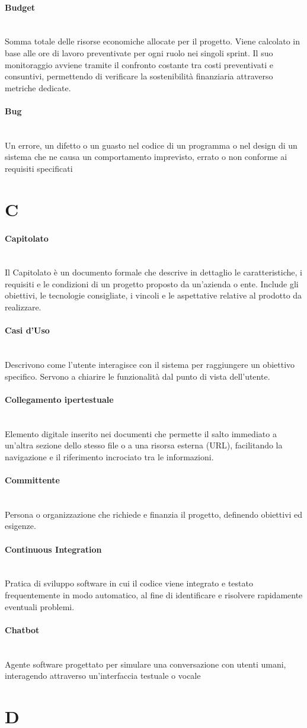 \documentclass[a4paper, 10pt, colorlinks=true, linkcolor=black, urlcolor=blue, citecolor=blue, hidelinks]{article}
\newcommand{\glossaryterm}[2]{
    \paragraph{#1 \label{term:#1}} \mbox{} \\
    #2
    \vspace{0.5em}
}
\begin{document}
\glossaryterm{Budget}{Somma totale delle risorse economiche allocate per il progetto. Viene calcolato in base alle ore di lavoro preventivate per ogni ruolo nei singoli sprint. Il suo monitoraggio avviene tramite il confronto costante tra costi preventivati e consuntivi, permettendo di verificare la sostenibilità finanziaria attraverso metriche dedicate.}

\glossaryterm{Bug}{Un errore, un difetto o un guasto nel codice di un programma o nel design di un sistema che ne causa un comportamento imprevisto, errato o non conforme ai requisiti specificati}

\newpage

\section*{C}

\glossaryterm{Capitolato}{Il Capitolato è un documento formale che descrive in dettaglio le caratteristiche, i requisiti e le condizioni di un progetto proposto da un'azienda o ente. Include gli obiettivi, le tecnologie consigliate, i vincoli e le aspettative relative al prodotto da realizzare.}

\glossaryterm{Casi d'Uso}{Descrivono come l'utente interagisce con il sistema per raggiungere un obiettivo specifico. Servono a chiarire le funzionalità dal punto di vista dell'utente.}

\glossaryterm{Collegamento ipertestuale}{Elemento digitale inserito nei documenti che permette il salto immediato a un'altra sezione dello stesso file o a una risorsa esterna (URL), facilitando la navigazione e il riferimento incrociato tra le informazioni.}

\glossaryterm{Committente}{Persona o organizzazione che richiede e finanzia il progetto, definendo obiettivi ed esigenze.}

\glossaryterm{Continuous Integration}{Pratica di sviluppo software in cui il codice viene integrato e testato frequentemente in modo automatico, al fine di identificare e risolvere rapidamente eventuali problemi.}

\glossaryterm{Chatbot}{Agente software progettato per simulare una conversazione con utenti umani, interagendo attraverso un'interfaccia testuale o vocale}

\newpage

\section*{D}
\end{document}
